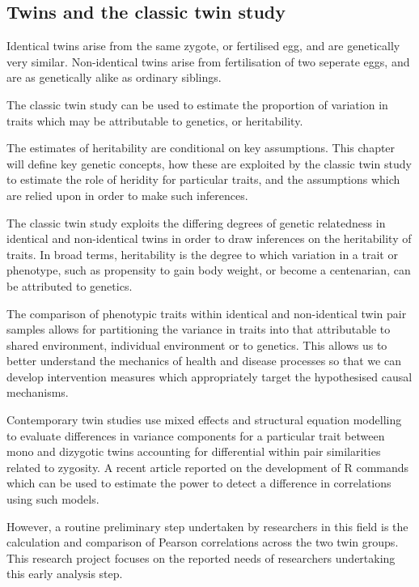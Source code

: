 \subsection{Twins and the classic twin study}
Identical twins arise from the same zygote, or fertilised egg, and are genetically very similar.  Non-identical twins arise from fertilisation of two seperate eggs, and are as genetically alike as ordinary siblings. 

The classic twin study can be used to estimate the proportion of variation in traits which may be attributable to genetics, or heritability.  

The estimates of heritability are conditional on key assumptions.  This chapter will define key genetic concepts, how these are exploited by the classic twin study to estimate the role of heridity for particular traits, and the assumptions which are relied upon in order to make such inferences.

The classic twin study exploits the differing degrees of genetic relatedness in identical and non-identical twins in order to draw inferences on the heritability of traits.  In broad terms, heritability is the degree to which variation in a trait or phenotype, such as propensity to gain body weight, or become a centenarian, can be attributed to genetics.

The comparison of phenotypic traits within identical and non-identical twin pair samples allows for partitioning the variance in traits into that attributable to  shared environment, individual environment or to genetics.  This allows us to better understand the mechanics of health and disease processes so that we can develop intervention measures which appropriately target the hypothesised causal mechanisms.

Contemporary twin studies use mixed effects and structural equation modelling to evaluate differences in variance components for a particular trait between mono and dizygotic twins accounting for differential within pair similarities related to zygosity.  A recent article reported on the development of R commands which can be used to estimate the power to detect a difference in correlations using such models.  

However, a routine preliminary step undertaken by researchers in this field is the calculation and comparison of Pearson correlations across the two twin groups.  This research project focuses on the reported needs of researchers undertaking this early analysis step.


